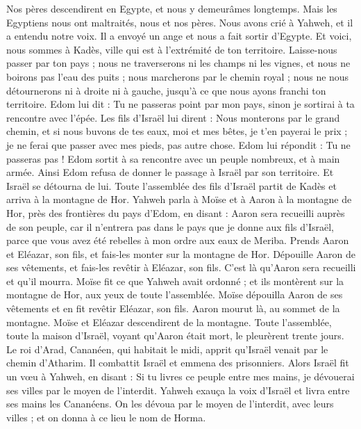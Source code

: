 \begin{multicols}{2}
Nos pères descendirent en Egypte, et nous y demeurâmes longtemps. Mais les Egyptiens nous ont maltraités, nous et nos pères.
Nous avons crié à Yahweh, et il a entendu notre voix. Il a envoyé un ange et nous a fait sortir d'Egypte. Et voici, nous sommes à Kadès, ville qui est à l'extrémité de ton territoire.
Laisse-nous passer par ton pays ; nous ne traverserons ni les champs ni les vignes, et nous ne boirons pas l'eau des puits ; nous marcherons par le chemin royal ; nous ne nous détournerons ni à droite ni à gauche, jusqu'à ce que nous ayons franchi ton territoire.
Edom lui dit : Tu ne passeras point par mon pays, sinon je sortirai à ta rencontre avec l'épée.
Les fils d'Israël lui dirent : Nous monterons par le grand chemin, et si nous buvons de tes eaux, moi et mes bêtes, je t'en payerai le prix ; je ne ferai que passer avec mes pieds, pas autre chose.
Edom lui répondit : Tu ne passeras pas ! Edom sortit à sa rencontre avec un peuple nombreux, et à main armée.
Ainsi Edom refusa de donner le passage à Israël par son territoire. Et Israël se détourna de lui.
Toute l'assemblée des fils d'Israël partit de Kadès et arriva à la montagne de Hor.
Yahweh parla à Moïse et à Aaron à la montagne de Hor, près des frontières du pays d'Edom, en disant :
Aaron sera recueilli auprès de son peuple, car il n'entrera pas dans le pays que je donne aux fils d'Israël, parce que vous avez été rebelles à mon ordre aux eaux de Meriba.
Prends Aaron et Eléazar, son fils, et fais-les monter sur la montagne de Hor.
Dépouille Aaron de ses vêtements, et fais-les revêtir à Eléazar, son fils. C'est là qu'Aaron sera recueilli et qu'il mourra.
Moïse fit ce que Yahweh avait ordonné ; et ils montèrent sur la montagne de Hor, aux yeux de toute l'assemblée.
Moïse dépouilla Aaron de ses vêtements et en fit revêtir Eléazar, son fils. Aaron mourut là, au sommet de la montagne. Moïse et Eléazar descendirent de la montagne.
Toute l'assemblée, toute la maison d'Israël, voyant qu'Aaron était mort, le pleurèrent trente jours.
\VerseOne{}Le roi d'Arad, Cananéen, qui habitait le midi, apprit qu'Israël venait par le chemin d'Atharim. Il combattit Israël et emmena des prisonniers.
Alors Israël fit un vœu à Yahweh, en disant : Si tu livres ce peuple entre mes mains, je dévouerai ses villes par le moyen de l'interdit.
Yahweh exauça la voix d'Israël et livra entre ses mains les Cananéens. On les dévoua par le moyen de l'interdit, avec leurs villes ; et on donna à ce lieu le nom de Horma.

\end{multicols}

